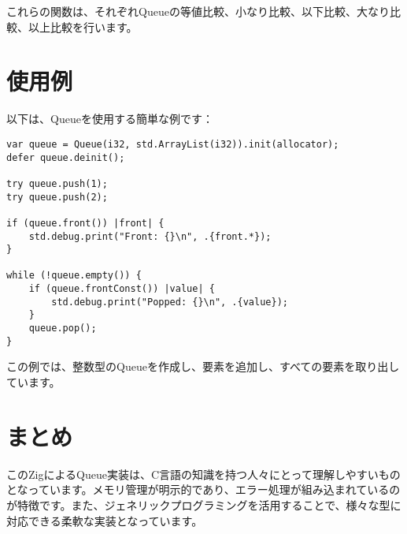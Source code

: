 \documentclass{ltjsarticle}
\begin{document}
これらの関数は、それぞれQueueの等値比較、小なり比較、以下比較、大なり比較、以上比較を行います。

\section{使用例}

以下は、Queueを使用する簡単な例です：

\begin{lstlisting}[style=zigstyle]
var queue = Queue(i32, std.ArrayList(i32)).init(allocator);
defer queue.deinit();

try queue.push(1);
try queue.push(2);

if (queue.front()) |front| {
    std.debug.print("Front: {}\n", .{front.*});
}

while (!queue.empty()) {
    if (queue.frontConst()) |value| {
        std.debug.print("Popped: {}\n", .{value});
    }
    queue.pop();
}
\end{lstlisting}

この例では、整数型のQueueを作成し、要素を追加し、すべての要素を取り出しています。

\section{まとめ}

このZigによるQueue実装は、C言語の知識を持つ人々にとって理解しやすいものとなっています。メモリ管理が明示的であり、エラー処理が組み込まれているのが特徴です。また、ジェネリックプログラミングを活用することで、様々な型に対応できる柔軟な実装となっています。
\end{document}

